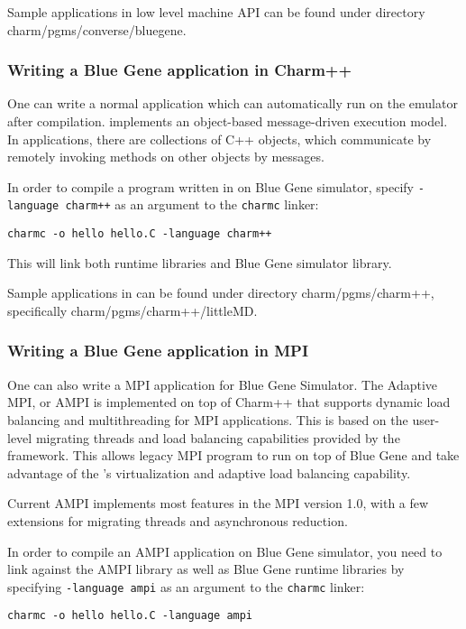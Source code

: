 Sample applications in low level machine API can be found under directory
charm/pgms/converse/bluegene.

\subsubsection{Writing a Blue Gene application in Charm++}

One can write a normal \charmpp{} application which can automatically 
run on the emulator after compilation. \charmpp{} implements
an object-based message-driven execution model. In \charmpp{} applications,
there are collections of C++ objects, which communicate by remotely invoking
methods on other objects by messages.

In order to compile a program written in \charmpp{} on Blue Gene simulator, 
specify \texttt{-language charm++} as an argument to the {\tt charmc} linker:
\begin{verbatim}
charmc -o hello hello.C -language charm++
\end{verbatim}
This will link both \charmpp{} runtime libraries and Blue Gene simulator 
library.

Sample applications in \charmpp{} can be found under directory
charm/pgms/charm++, specifically charm/pgms/charm++/littleMD.

\subsubsection{Writing a Blue Gene application in MPI}

One can also write a MPI application for Blue Gene Simulator.
The Adaptive MPI, or AMPI is implemented on top of Charm++ that supports
dynamic load balancing and multithreading for MPI applications. This is based
on the user-level migrating threads and load balancing capabilities provided
by the \charmpp{} framework. This allows legacy MPI program to run 
on top of Blue Gene \charmpp{} and take advantage of the \charmpp{}'s
virtualization and adaptive load balancing capability.

Current AMPI implements most features in the MPI version 1.0, with a few
extensions for migrating threads and asynchronous reduction.

In order to compile an AMPI application on Blue Gene simulator, you need 
to link against the AMPI library as well as Blue Gene \charmpp{} runtime
libraries by specifying \texttt{-language ampi} as an argument to 
the {\tt charmc} linker:
\begin{verbatim}
charmc -o hello hello.C -language ampi
\end{verbatim}

